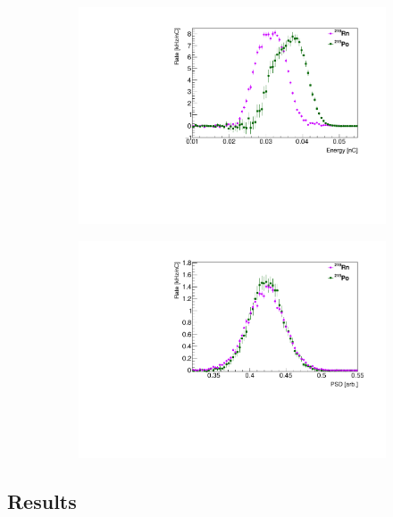 \begin{figure}[H]
	\centering
\begin{subfigure}{0.5\linewidth}
	\centering
	\includegraphics[width=1.\linewidth]{"tex/6-ac227-images/BNL/RnPoEn_TimeBin23_S2"}
	\caption{}
\end{subfigure}%
\begin{subfigure}{0.5\linewidth}
	\centering
	\includegraphics[width=1.\linewidth]{"tex/6-ac227-images/BNL/RnPoPSD_TimeBin23_S2"}
	\caption{}
\end{subfigure}
	\caption{}
	\label{fig:rnpoenpsd}
\end{figure}

\subsection{Results}

